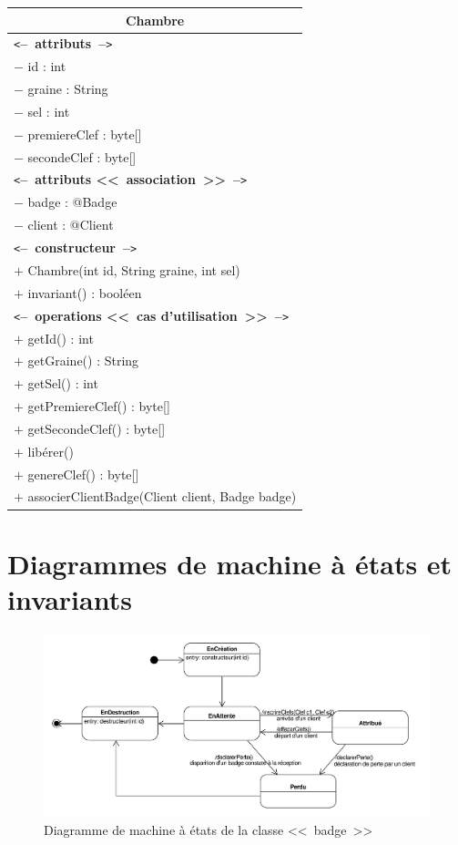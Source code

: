 \documentclass[11pt,article]{article}
\newcommand{\cmt}[1]{\texttt{<}\textbf{--~#1~--}\texttt{>}}
\begin{document}
\begin{center}
\begin{longtable}{|p{15cm}|}
\hline
\multicolumn{1}{|c|}{{\Large \textsf{Chambre}}} \\
\hline
\cmt{attributs}\\
$-$ id : int \\
$-$ graine : String \\
$-$ sel : int \\
$-$ premiereClef : byte[] \\
$-$ secondeClef : byte[] \\
\cmt{attributs <<~association~>>}\\
$-$ badge : @Badge \\
$-$ client : @Client \\
\hline
\cmt{constructeur} \\
$+$ Chambre(int id, String graine, int sel)\\
$+$ invariant() : booléen\\
\cmt{operations <<~cas d'utilisation~>>} \\
$+$ getId() : int \\
$+$ getGraine() : String \\
$+$ getSel() : int \\
$+$ getPremiereClef() : byte[] \\
$+$ getSecondeClef() : byte[] \\
$+$ libérer() \\
$+$ genereClef() : byte[] \\
$+$ associerClientBadge(Client client, Badge badge) \\
\hline
\end{longtable}
\end{center}
\newpage

\section{Diagrammes de machine à états et invariants}

\begin{figure}[h!]
\begin{center}
\includegraphics[scale=0.5]{DiagrammesDeMachineAEtats/gestionclefshotel_uml_diag_machine_a_etats_badge}
\caption{Diagramme de machine à états de la classe <<~badge~>>}
\end{center}
\label{umlet_diag_classes}
\end{figure}
\end{document}
